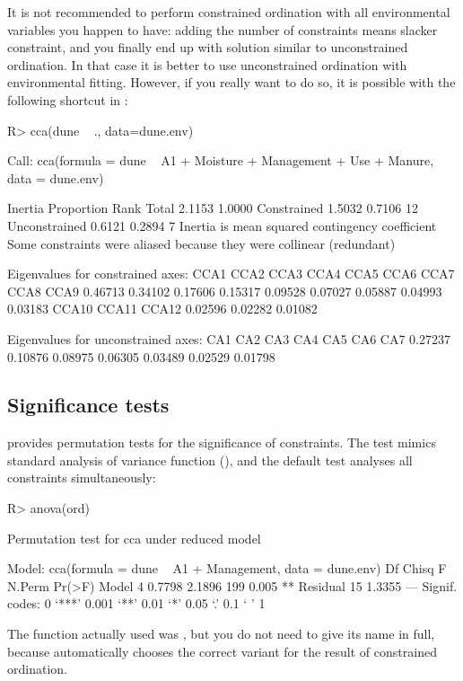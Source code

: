 \documentclass[article,nojss]{jss}
\begin{document}
It is not recommended to perform constrained ordination with all
environmental variables you happen to have: adding the number of
constraints means slacker constraint, and you finally end up with
solution similar to unconstrained ordination. In that case it is
better to use unconstrained ordination with environmental fitting.
However, if you really want to do so, it is possible with the
following shortcut in :
\begin{Schunk}
\begin{Sinput}
R> cca(dune ~ ., data=dune.env)
\end{Sinput}
\begin{Soutput}
Call: cca(formula = dune ~ A1 + Moisture + Management + Use +
Manure, data = dune.env)

              Inertia Proportion Rank
Total          2.1153     1.0000     
Constrained    1.5032     0.7106   12
Unconstrained  0.6121     0.2894    7
Inertia is mean squared contingency coefficient 
Some constraints were aliased because they were collinear (redundant)

Eigenvalues for constrained axes:
   CCA1    CCA2    CCA3    CCA4    CCA5    CCA6    CCA7    CCA8    CCA9 
0.46713 0.34102 0.17606 0.15317 0.09528 0.07027 0.05887 0.04993 0.03183 
  CCA10   CCA11   CCA12 
0.02596 0.02282 0.01082 

Eigenvalues for unconstrained axes:
    CA1     CA2     CA3     CA4     CA5     CA6     CA7 
0.27237 0.10876 0.08975 0.06305 0.03489 0.02529 0.01798 
\end{Soutput}
\end{Schunk}

\subsection{Significance tests}

 provides permutation tests for the significance of
constraints.  The test mimics standard analysis of variance function
(), and the default test analyses all constraints
simultaneously:
\begin{Schunk}
\begin{Sinput}
R> anova(ord)
\end{Sinput}
\begin{Soutput}
Permutation test for cca under reduced model

Model: cca(formula = dune ~ A1 + Management, data = dune.env)
         Df  Chisq      F N.Perm Pr(>F)   
Model     4 0.7798 2.1896    199  0.005 **
Residual 15 1.3355                        
---
Signif. codes:  0 ‘***’ 0.001 ‘**’ 0.01 ‘*’ 0.05 ‘.’ 0.1 ‘ ’ 1 
\end{Soutput}
\end{Schunk}
The function actually used was , but you do not need
to give its name in full, because  automatically chooses the
correct  variant for the result of constrained
ordination.
\end{document}
